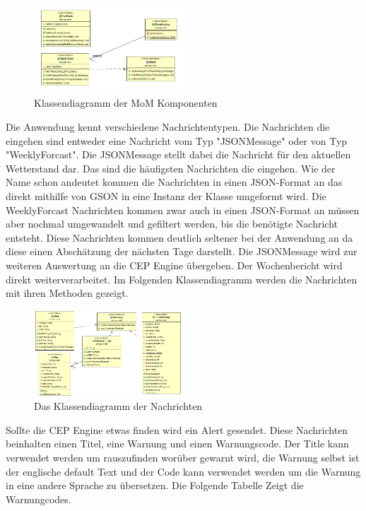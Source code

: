 \begin{figure}[htbp]
	\centering
	\includegraphics[width=0.5\textwidth]{Bilder/MoMKomponents.png}
	\caption{Klassendiagramm der MoM Komponenten}
	\label{img:MoMDiagramm}
\end{figure} 
Die Anwendung kennt verschiedene Nachrichtentypen. Die Nachrichten die eingehen sind entweder eine Nachricht vom Typ "JSONMessage" oder von Typ "WeeklyForcast". Die JSONMessage stellt dabei die Nachricht für den aktuellen Wetterstand dar. Das sind die häufigsten Nachrichten die eingehen. Wie der Name schon andeutet kommen die Nachrichten in einen JSON-Format an das direkt mithilfe von GSON in eine Instanz der Klasse umgeformt wird. Die WeeklyForcast Nachrichten kommen zwar auch in einen JSON-Format an müssen aber nochmal umgewandelt und gefiltert werden, bis die benötigte Nachricht entsteht. Diese Nachrichten kommen deutlich seltener bei der Anwendung an da diese einen Abschätzung der nächsten Tage darstellt. Die JSONMessage wird zur weiteren Auswertung an die CEP Engine übergeben. Der Wochenbericht wird direkt weiterverarbeitet. Im Folgenden Klassendiagramm werden die Nachrichten mit ihren Methoden gezeigt. 
\begin{figure}[htbp]
	\centering
	\includegraphics[width=0.5\textwidth]{Bilder/News.png}
	\caption{Das Klassendiagramm der Nachrichten}
	\label{img:eventDiagramm}
\end{figure} 
Sollte die CEP Engine etwas finden wird ein Alert gesendet. Diese Nachrichten beinhalten einen Titel, eine Warnung und einen Warnungscode. Der Title kann verwendet werden um rauszufinden worüber gewarnt wird, die Warnung selbst ist der englische default Text und der Code kann verwendet werden um die Warnung in eine andere Sprache zu übersetzen.  Die Folgende Tabelle Zeigt die Warnungcodes. 
